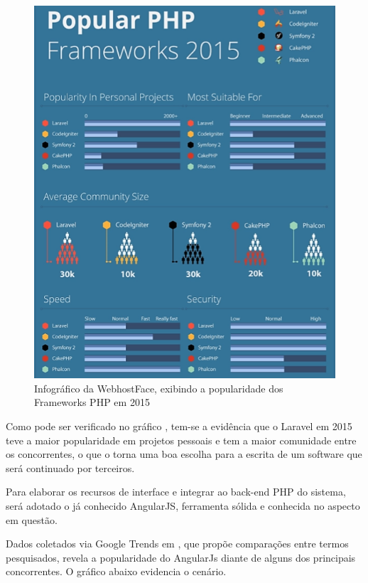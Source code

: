 \begin{figure}
	\label{fig:graficoWebhostface}
	\includegraphics[width=1\textwidth]{img/infografico_webhostface}
	\caption{Infográfico da WebhostFace, exibindo a popularidade dos Frameworks PHP em 2015}
\end{figure}


Como pode ser verificado no gráfico \cite{WebhostFace-PHP-Frameworks}, tem-se a evidência que o Laravel em 2015 teve a maior popularidade em projetos pessoais e tem a maior comunidade entre os concorrentes, o que o torna uma boa escolha para a escrita de um software que será continuado por terceiros.


Para elaborar os recursos de interface e integrar ao back-end PHP do sistema, será adotado o já conhecido AngularJS, ferramenta sólida e conhecida no aspecto em questão. 


Dados coletados via Google Trends em \citealp{GoogleTrends-Front-end-Frameworks}, que propõe comparações entre termos pesquisados, revela a popularidade do AngularJs diante de alguns dos principais concorrentes. O gráfico abaixo evidencia o cenário.


